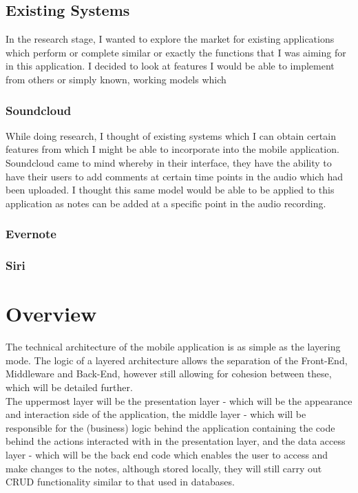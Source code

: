 \documentclass{report}
\begin{document}
		\subsection{Existing Systems}
In the research stage, I wanted to explore the market for existing applications which perform or complete similar or exactly the functions that I was aiming for in this application. I decided to look at features I would be able to implement from others or simply known, working models which 
			\subsubsection{Soundcloud}
While doing research, I thought of existing systems which I can obtain certain features from which I might be able to incorporate into the mobile application. Soundcloud came to mind whereby in their interface, they have the ability to have their users to add comments at certain time points in the audio which had been uploaded. I thought this same model would be able to be applied to this application as notes can be added at a specific point in the audio recording.
			\subsubsection{Evernote}
			\subsubsection{Siri}

	\section{Overview}
The technical architecture of the mobile application is as simple as the layering mode. The logic of a layered architecture allows the separation of the Front-End, Middleware and Back-End, however still allowing for cohesion between these, which will be detailed further.\\

The uppermost layer will be the presentation layer - which will be the appearance and interaction side of the application, the middle layer - which will be responsible for the (business) logic behind the application containing the code behind the actions interacted with in the presentation layer, and the data access layer - which will be the back end code which enables the user to access and make changes to the notes, although stored locally, they will still carry out CRUD functionality similar to that used in databases.
\end{document}

